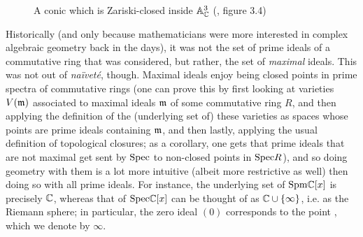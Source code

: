 \begin{example}
\begin{enumerate}
\begin{figure}[H]
                            \caption{A conic which is Zariski-closed inside $\mathbb{A}^3_{\mathbb{C}}$ (\cite{risingsea}, figure 3.4)}
                            \label{fig: conic}
                        \end{figure}
                \end{enumerate}
            \end{example}
            
            \begin{remark}
                Historically (and only because mathematicians were more interested in complex algebraic geometry back in the days), it was not the set of prime ideals of a commutative ring that was considered, but rather, the set of \textit{maximal} ideals. This was not out of \textit{na\"ivet\'e}, though. Maximal ideals enjoy being closed points in prime spectra of commutative rings (one can prove this by first looking at varieties $V(\mathfrak{m})$ associated to maximal ideals $\mathfrak{m}$ of some commutative ring $R$, and then applying the definition of the (underlying set of) these varieties as spaces whose points are prime ideals containing $\mathfrak{m}$, and then lastly, applying the usual definition of topological closures; as a corollary, one gets that prime ideals that are not maximal get sent by $\mathrm{Spec}$ to non-closed points in $\mathrm{Spec} R$), and so doing geometry with them is a lot more intuitive (albeit more restrictive as well) then doing so with all prime ideals. For instance, the underlying set of $\mathrm{Spm} \mathbb{C}[x]$ is precisely $\mathbb{C}$, whereas that of $\mathrm{Spec} \mathbb{C}[x]$ can be thought of as $\mathbb{C} \cup \{\infty\}$, i.e. as the Riemann sphere; in particular, the zero ideal $(0)$ corresponds to the point , which we denote by $\infty$. 
            \end{remark}
            
